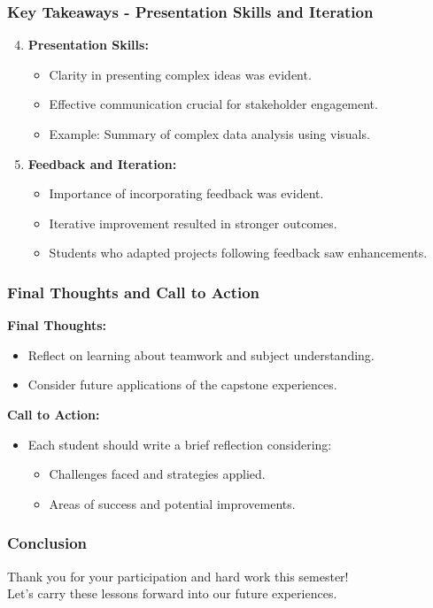 \documentclass[aspectratio=169]{beamer}
\begin{document}
\begin{frame}[fragile]
    \frametitle{Key Takeaways - Presentation Skills and Iteration}
    \begin{enumerate}
        \setcounter{enumi}{3}
        \item \textbf{Presentation Skills:}
        \begin{itemize}
            \item Clarity in presenting complex ideas was evident.
            \item Effective communication crucial for stakeholder engagement.
            \item Example: Summary of complex data analysis using visuals.
        \end{itemize}
        
        \item \textbf{Feedback and Iteration:}
        \begin{itemize}
            \item Importance of incorporating feedback was evident.
            \item Iterative improvement resulted in stronger outcomes.
            \item Students who adapted projects following feedback saw enhancements.
        \end{itemize}
    \end{enumerate}
\end{frame}

\begin{frame}[fragile]
    \frametitle{Final Thoughts and Call to Action}
    \textbf{Final Thoughts:}
    \begin{itemize}
        \item Reflect on learning about teamwork and subject understanding.
        \item Consider future applications of the capstone experiences.
    \end{itemize}
    
    \textbf{Call to Action:}
    \begin{itemize}
        \item Each student should write a brief reflection considering:
        \begin{itemize}
            \item Challenges faced and strategies applied.
            \item Areas of success and potential improvements.
        \end{itemize}
    \end{itemize}
\end{frame}

\begin{frame}[fragile]
    \frametitle{Conclusion}
    \centering
    Thank you for your participation and hard work this semester! 
    \\
    Let's carry these lessons forward into our future experiences.
\end{frame}
\end{document}
